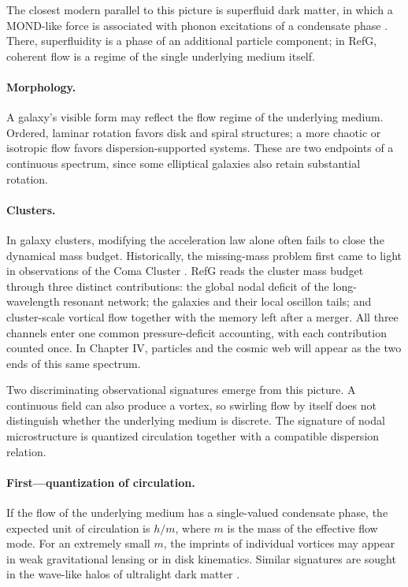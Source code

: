 \documentclass[11pt,a4paper]{article}
\begin{document}
The closest modern parallel to this picture is superfluid dark matter, in which a MOND-like force is associated with phonon excitations of a condensate phase \citep{berezhiani2015}. There, superfluidity is a phase of an additional particle component; in RefG, coherent flow is a regime of the single underlying medium itself.

\paragraph{Morphology.} A galaxy's visible form may reflect the flow regime of the underlying medium. Ordered, laminar rotation favors disk and spiral structures; a more chaotic or isotropic flow favors dispersion-supported systems. These are two endpoints of a continuous spectrum, since some elliptical galaxies also retain substantial rotation.

\paragraph{Clusters.} In galaxy clusters, modifying the acceleration law alone often fails to close the dynamical mass budget. Historically, the missing-mass problem first came to light in observations of the Coma Cluster \citep{zwicky1933}. RefG reads the cluster mass budget through three distinct contributions: the global nodal deficit of the long-wavelength resonant network; the galaxies and their local oscillon tails; and cluster-scale vortical flow together with the memory left after a merger. All three channels enter one common pressure-deficit accounting, with each contribution counted once. In Chapter IV, particles and the cosmic web will appear as the two ends of this same spectrum.

Two discriminating observational signatures emerge from this picture. A continuous field can also produce a vortex, so swirling flow by itself does not distinguish whether the underlying medium is discrete. The signature of nodal microstructure is quantized circulation together with a compatible dispersion relation.

\paragraph{First---quantization of circulation.} If the flow of the underlying medium has a single-valued condensate phase, the expected unit of circulation is $h/m$, where $m$ is the mass of the effective flow mode. For an extremely small $m$, the imprints of individual vortices may appear in weak gravitational lensing or in disk kinematics. Similar signatures are sought in the wave-like halos of ultralight dark matter \citep{hu2000,hui2021}.
\end{document}
